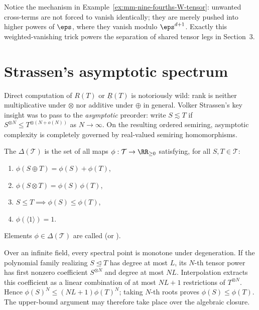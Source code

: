 Notice the mechanism in Example~\ref{ex:mm-nine-fourths-W-tensor}: unwanted cross-terms are not forced to vanish identically; they are merely pushed into higher powers of \(\eps\), where they vanish modulo \(\eps^{d+1}\). Exactly this weighted-vanishing trick powers the separation of shared tensor legs in Section~3.

\section{Strassen's asymptotic spectrum}

Direct computation of \(R(T)\) or \(\underline{R}(T)\) is notoriously wild: rank is neither multiplicative under \(\otimes\) nor additive under \(\oplus\) in general. Volker Strassen's key insight was to pass to the \emph{asymptotic} preorder: write \(S \lesssim T\) if \(S^{\otimes N} \le T^{\otimes (N + o(N))}\) as \(N \to \infty\). On the resulting ordered semiring, asymptotic complexity is completely governed by real-valued semiring homomorphisms.

\begin{definition}
\label{def:mm-nine-fourths-spectrum}
The  \(\Delta(\mathcal{T})\) is the set of all maps \(\phi : \mathcal{T} \to \RR_{\ge 0}\) satisfying, for all \(S, T \in \mathcal{T}\):
\begin{enumerate}
  \item \(\phi(S \oplus T) = \phi(S) + \phi(T)\),
  \item \(\phi(S \otimes T) = \phi(S)\,\phi(T)\),
  \item \(S \le T \implies \phi(S) \le \phi(T)\),
  \item \(\phi(\langle 1 \rangle) = 1\).
\end{enumerate}
Elements \(\phi \in \Delta(\mathcal{T})\) are called  (or ).
\end{definition}

Over an infinite field, every spectral point is monotone under degeneration. If the polynomial family realizing \(S\trianglelefteq T\) has degree at most \(L\), its \(N\)-th tensor power has first nonzero coefficient \(S^{\otimes N}\) and degree at most \(NL\). Interpolation extracts this coefficient as a linear combination of at most \(NL+1\) restrictions of \(T^{\otimes N}\). Hence \(\phi(S)^N\leq(NL+1)\phi(T)^N\); taking \(N\)-th roots proves \(\phi(S)\leq\phi(T)\). The upper-bound argument may therefore take place over the algebraic closure.


